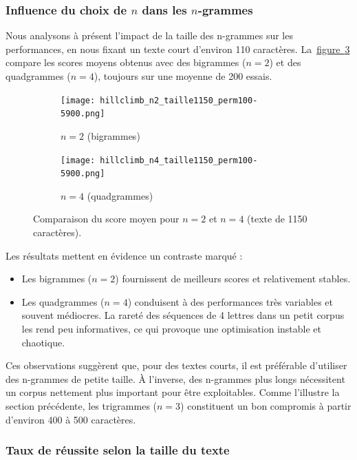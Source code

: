 \documentclass[a4paper]{article}
\newcommand{\figref}[1]{\hyperref[#1]{figure~\ref*{#1}}}
\begin{document}
\subsubsection{Influence du choix de $n$ dans les $n$-grammes}

Nous analysons à présent l’impact de la taille des n-grammes sur les performances, en nous fixant un texte court d’environ 110 caractères. La~\figref{fig:ngrams-1150} compare les scores moyens obtenus avec des bigrammes ($n=2$) et des quadgrammes ($n=4$), toujours sur une moyenne de 200 essais.


\begin{figure}[H]
    \centering
    \begin{subfigure}[b]{0.49\textwidth}
        \texttt{[image: hillclimb\_n2\_taille1150\_perm100-5900.png]}
        \caption{$n = 2$ (bigrammes)}
        \label{fig:n2-110}
    \end{subfigure}
    \hfill
    \begin{subfigure}[b]{0.49\textwidth}
        \texttt{[image: hillclimb\_n4\_taille1150\_perm100-5900.png]}
        \caption{$n = 4$ (quadgrammes)}
        \label{fig:n4-110}
    \end{subfigure}
    \caption{Comparaison du score moyen pour $n = 2$ et $n = 4$ (texte de 1150 caractères).}
    \label{fig:ngrams-1150}
\end{figure}
Les résultats mettent en évidence un contraste marqué :

\begin{itemize}
    \item Les bigrammes ($n=2$) fournissent de meilleurs scores et relativement stables.
    \item Les quadgrammes ($n=4$) conduisent à des performances très variables et souvent médiocres. La rareté des séquences de 4 lettres dans un petit corpus les rend peu informatives, ce qui provoque une optimisation instable et chaotique.
\end{itemize}

Ces observations suggèrent que, pour des textes courts, il est préférable d’utiliser des n-grammes de petite taille. À l’inverse, des n-grammes plus longs nécessitent un corpus nettement plus important pour être exploitables. Comme l’illustre la section précédente, les trigrammes ($n=3$) constituent un bon compromis à partir d’environ 400 à 500 caractères.

\subsubsection{Taux de réussite selon la taille du texte}
\end{document}
